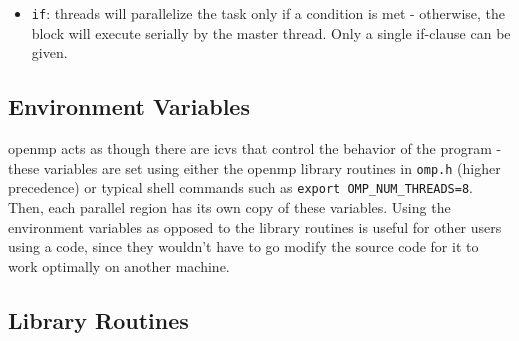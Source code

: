\documentclass[10pt]{article}
\newcounter{subsubsubsection}[subsubsection]
\begin{document}
\begin{flushleft}

\begin{itemize}
\item {\tt if}: threads will parallelize the task only if a condition is met - otherwise, the block will execute serially by the master thread. Only a single if-clause can be given. 
\end{itemize}

\subsection{Environment Variables}

\gls{openmp} acts as though there are \gls{icv}s that control the behavior of the program - these variables are set using either the \gls{openmp} library routines in {\tt omp.h} (higher precedence) or typical shell commands such as {\tt export OMP\_NUM\_THREADS=8}. Then, each parallel region has its own copy of these variables. Using the environment variables as opposed to the library routines is useful for other users using a code, since they wouldn't have to go modify the source code for it to work optimally on another machine.

\subsection{Library Routines}


\end{flushleft}
\end{document}
